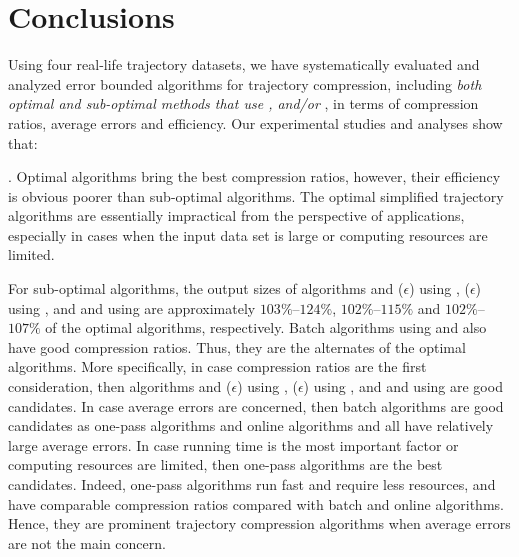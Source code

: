 \vspace{-1ex}
\section{Conclusions}

Using four real-life trajectory datasets, we have systematically evaluated and analyzed error bounded \lsa algorithms for trajectory compression, including \emph{both optimal and sub-optimal methods that use \ped, \sed and/or \dad},  in terms of compression ratios, average errors and efficiency.
Our experimental studies and analyses show that:


. Optimal algorithms bring the best compression ratios, however, their efficiency is obvious poorer than sub-optimal algorithms. The optimal simplified trajectory algorithms are essentially impractical from the perspective of applications, especially in cases when the input data set is large or computing resources are limited.

For sub-optimal algorithms, the output sizes of algorithms \bqsa and \siped($\epsilon$) using \ped, \cised($\epsilon$) using \sed, and \tpa and \interval using \dad are approximately $103\%$--$124\%$, $102\%$--$115\%$ and $102\%$--$107\%$ of the optimal algorithms, respectively. Batch algorithms using \ped and \sed also have good compression ratios. Thus, they are the alternates of the optimal algorithms.
%
More specifically, in case compression ratios are the first consideration, then algorithms \bqsa and \siped($\epsilon$) using \ped, \cised($\epsilon$) using \sed, and \tpa and \interval using \dad are good candidates.
%
In case average errors are concerned, then batch algorithms are good candidates as one-pass algorithms and online algorithms \opwa and \bqsa all have relatively large average errors. %
%
In case running time is the most important factor or computing resources are limited, then one-pass algorithms are the best candidates.
%
Indeed, one-pass algorithms run fast and require less resources, and have comparable compression ratios compared with batch and online algorithms. Hence, they are prominent trajectory compression algorithms when average errors are not the main concern.

